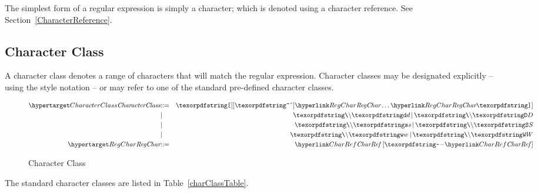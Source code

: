The simplest form of a regular expression is simply a character; which is denoted using a character reference. See Section~\vref{CharacterReference}.

\subsection{Character Class}
\label{characterClass}
A character class denotes a range of characters that will match the regular expression. Character classes may be designated explicitly -- using the \q{[a-z]} style notation -- or may refer to one of the standard pre-defined character classes.

\begin{figure}[htbp]
\begin{eqnarray*}
\ntDef{CharacterClass}&\arrow&\q{[}[\q{\uphat}]\ntRef{RegChar}\ldots\ntRef{RegChar}\q{]}\\
&\choice&\q{\bsl}\q{d}\,\choice\,\q{\bsl}\q{D}\\
&\choice&\q{\bsl}\q{s}\,\choice\,\q{\bsl}\q{S}\\
&\choice&\q{\bsl}\q{w}\,\choice\,\q{\bsl}\q{W}\\
\ntDef{RegChar}&\arrow&\ntRef{CharRef}\ [\q{-}\ntRef{CharRef}\,]
\end{eqnarray*}
\caption{Character Class}
\label{charClassFig}
\end{figure}

The standard character classes are listed in Table~\vref{charClassTable}.

